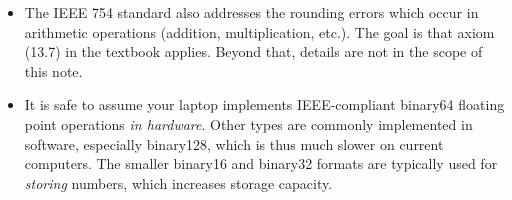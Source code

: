 \documentclass[11pt]{amsart}
\begin{document}
\begin{itemize}
\item The IEEE 754 standard also addresses the rounding errors which occur in arithmetic operations (addition, multiplication, etc.).  The goal is that axiom (13.7) in the textbook applies.  Beyond that, details are not in the scope of this note.

\item It is safe to assume your laptop implements IEEE-compliant binary64 floating point operations \emph{in hardware}.  Other types are commonly implemented in software, especially binary128, which is thus much slower on current computers.  The smaller binary16 and binary32 formats are typically used for \emph{storing} numbers, which increases storage capacity.

\end{itemize}
\end{document}

